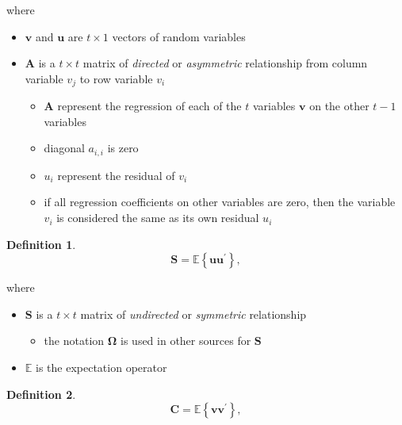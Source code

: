 \documentclass[
]{book}
\providecommand{\tightlist}{%
  \setlength{\itemsep}{0pt}\setlength{\parskip}{0pt}}
\theoremstyle{definition}
\newtheorem{definition}{Definition}[chapter]
\theoremstyle{definition}
\theoremstyle{definition}
\theoremstyle{remark}
\begin{document}
\noindent where

\begin{itemize}
\tightlist
\item
  \(\mathbf{v}\) and \(\mathbf{u}\) are \(t \times 1\) vectors of random variables
\item
  \(\mathbf{A}\) is a \(t \times t\) matrix of \emph{directed} or \emph{asymmetric} relationship
  from column variable \(v_j\) to row variable \(v_i\)

  \begin{itemize}
  \tightlist
  \item
    \(\mathbf{A}\) represent the regression of each of the \(t\) variables \(\mathbf{v}\) on the other \(t - 1\) variables
  \item
    diagonal \(a_{i,i}\) is zero
  \item
    \(u_i\) represent the residual of \(v_i\)
  \item
    if all regression coefficients on other variables are zero,
    then the variable \(v_i\) is considered the same as its own residual \(u_i\)
  \end{itemize}
\end{itemize}

\begin{definition}
\protect\hypertarget{def:unnamed-chunk-3}{}{\label{def:unnamed-chunk-3} }\begin{equation}
  \mathbf{S}
  =
  \mathbb{E}
  \left\{
    \mathbf{u} \mathbf{u}^{\prime}
  \right\} ,
\end{equation}
\end{definition}

\noindent where

\begin{itemize}
\tightlist
\item
  \(\mathbf{S}\) is a \(t \times t\) matrix of \emph{undirected} or \emph{symmetric} relationship

  \begin{itemize}
  \tightlist
  \item
    the notation \(\boldsymbol{\Omega}\) is used in other sources for \(\mathbf{S}\)
  \end{itemize}
\item
  \(\mathbb{E}\) is the expectation operator
\end{itemize}

\begin{definition}
\protect\hypertarget{def:unnamed-chunk-4}{}{\label{def:unnamed-chunk-4} }\begin{equation}
  \mathbf{C}
  =
  \mathbb{E}
  \left\{
    \mathbf{v} \mathbf{v}^{\prime}
  \right\} ,
\end{equation}
\end{definition}
\end{document}
